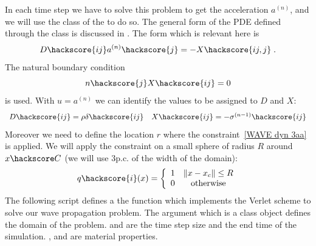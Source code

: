 In each time step we have to solve this problem to get the acceleration $a^{(n)}$, and we will
use the \LinearPDE class of the \linearPDEs to do so. The general form of the PDE defined through
the \LinearPDE class is discussed in . The form which is relevant here is
\begin{equation}\label{WAVE dyn 100}
D\hackscore{ij} a^{(n)}\hackscore{j} = - X\hackscore{ij,j}\; .
\end{equation}
The natural boundary condition
\begin{equation}\label{WAVE dyn 101}
n\hackscore{j}X\hackscore{ij} =0 
\end{equation}
is used. 
With $u=a^{(n)}$ we can identify the values to be assigned to $D$ and $X$:
\begin{equation}\label{WAVE  dyn 6}
\begin{array}{ll}
D\hackscore{ij}=\rho \delta\hackscore{ij}&
X\hackscore{ij}=-\sigma^{(n-1)}\hackscore{ij} \\
\end{array}
\end{equation}
Moreover we need to define the location $r$ where the constraint~\ref{WAVE dyn 3aa} is applied. We will apply
the constraint on a small sphere of radius $R$ around $x\hackscore C$ (we will use 3p.c. of the width of the domain):  
\begin{equation}\label{WAVE  dyn 6 1}
q\hackscore{i}(x) = 
\left\{
\begin{array}{rc}
1 & \|x-x_c\|\le R \\
0 & \mbox{otherwise}
\end{array}
\right.
\end{equation}
The following script defines a the function  which
implements the Verlet scheme to solve our wave propagation problem. 
The argument  which is a \Domain class object
defines the domain of the problem.  and  are the time step size
and the end time of the simulation. ,  and 
 are material properties. 
